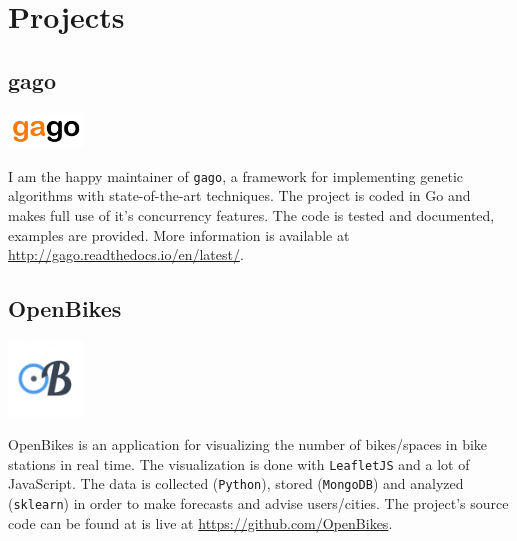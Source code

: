 \section{Projects}

\subsection{gago}
\noindent
\begin{minipage}{.15\textwidth}
\centerline{\includegraphics[width=20mm]{img/gago}}
\end{minipage}%
\hspace{5mm}
\begin{minipage}{.8\textwidth}
\justify
I am the happy maintainer of \texttt{gago}, a framework for implementing genetic algorithms with state-of-the-art techniques. The project is coded in Go and makes full use of it's concurrency features. The code is tested and documented, examples are provided. More information is available at \textcolor{green}{\url{http://gago.readthedocs.io/en/latest/}}.
\end{minipage}

\subsection{OpenBikes}
\noindent
\begin{minipage}{.15\textwidth}
\centerline{\includegraphics[width=20mm]{img/openbikes}}
\end{minipage}%
\hspace{5mm}
\begin{minipage}{.8\textwidth}
\justify
OpenBikes is an application for visualizing the number of bikes/spaces in bike stations in real time. The visualization is done with \texttt{LeafletJS} and a lot of JavaScript. The data is collected (\texttt{Python}), stored (\texttt{MongoDB}) and analyzed (\texttt{sklearn}) in order to make forecasts and advise users/cities. The project's source code can be found at is live at \textcolor{green}{\url{https://github.com/OpenBikes}}.
\end{minipage}

